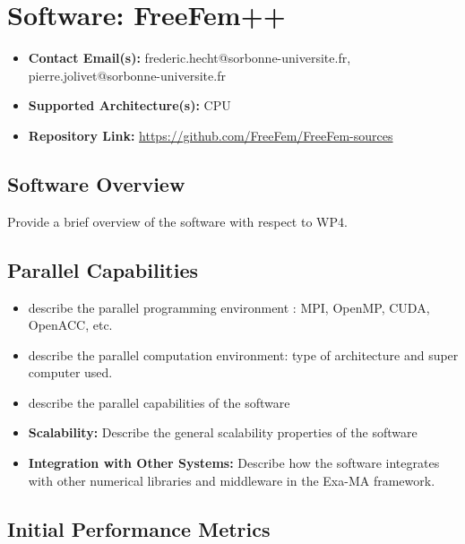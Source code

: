 \section{Software: FreeFem++}
\label{sec:WP4:FreeFem++:software}

\begin{itemize}
    \item \textbf{Contact Email(s):} frederic.hecht@sorbonne-universite.fr, pierre.jolivet@sorbonne-universite.fr
    \item \textbf{Supported Architecture(s):} CPU
    \item \textbf{Repository Link:} \href{https://github.com/FreeFem/FreeFem-sources}{https://github.com/FreeFem/FreeFem-sources}
\end{itemize}

\subsection{Software Overview}
\label{sec:WP4:FreeFem++:summary}

Provide a brief overview of the software with respect to WP4.

\subsection{Parallel Capabilities}
\label{sec:WP4:FreeFem++:performances}


\begin{itemize}
    \item describe the parallel programming  environment : MPI, OpenMP, CUDA, OpenACC, etc.
    \item describe the parallel computation environment: type of architecture and super computer used.
    \item describe the parallel capabilities of the software
    \item \textbf{Scalability:} Describe the general scalability properties of the software
    \item \textbf{Integration with Other Systems:} Describe how the software integrates with other numerical libraries and middleware in the Exa-MA framework.
\end{itemize}

\subsection{Initial Performance Metrics}
\label{sec:WP4:FreeFem++:metrics}

